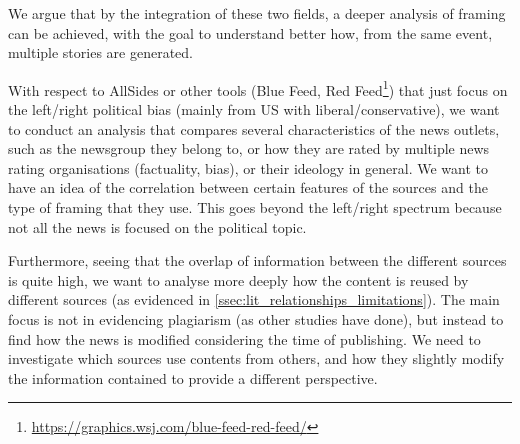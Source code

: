 


We argue that by the integration of these two fields, a deeper analysis of framing can be achieved, with the goal to understand better how, from the same event, multiple stories are generated.


With respect to AllSides or other tools (Blue Feed, Red Feed\footnote{\url{https://graphics.wsj.com/blue-feed-red-feed/}}) that just focus on the left/right political bias (mainly from US with liberal/conservative), we want to conduct an analysis that compares several characteristics of the news outlets, such as the newsgroup they belong to, or how they are rated by multiple news rating organisations (factuality, bias), or their ideology in general.
We want to have an idea of the correlation between certain features of the sources and the type of framing that they use. This goes beyond the left/right spectrum because not all the news is focused on the political topic.


Furthermore, seeing that the overlap of information between the different sources is quite high, we want to analyse more deeply how the content is reused by different sources (as evidenced in \ref{ssec:lit_relationships_limitations}). The main focus is not in evidencing plagiarism (as other studies have done), but instead to find how the news is modified considering the time of publishing.
We need to investigate which sources use contents from others, and how they slightly modify the information contained to provide a different perspective.




